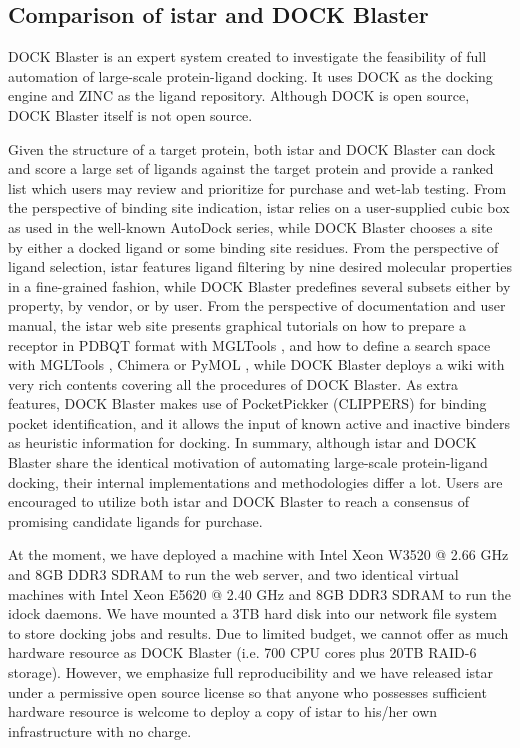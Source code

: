 \documentclass[10pt]{article}
\begin{document}
\subsection*{Comparison of istar and DOCK Blaster}
DOCK Blaster \cite{557} is an expert system created to investigate the feasibility of full automation of large-scale protein-ligand docking. It uses DOCK \cite{1222} as the docking engine and ZINC \cite{532,1178} as the ligand repository. Although DOCK is open source, DOCK Blaster itself is not open source.

Given the structure of a target protein, both istar and DOCK Blaster can dock and score a large set of ligands against the target protein and provide a ranked list which users may review and prioritize for purchase and wet-lab testing. From the perspective of binding site indication, istar relies on a user-supplied cubic box as used in the well-known AutoDock series, while DOCK Blaster chooses a site by either a docked ligand or some binding site residues. From the perspective of ligand selection, istar features ligand filtering by nine desired molecular properties in a fine-grained fashion, while DOCK Blaster predefines several subsets either by property, by vendor, or by user. From the perspective of documentation and user manual, the istar web site presents graphical tutorials on how to prepare a receptor in PDBQT format with MGLTools \cite{596}, and how to define a search space with MGLTools \cite{596}, Chimera \cite{1219} or PyMOL \cite{1221}, while DOCK Blaster deploys a wiki with very rich contents covering all the procedures of DOCK Blaster. As extra features, DOCK Blaster makes use of PocketPickker (CLIPPERS) \cite{395} for binding pocket identification, and it allows the input of known active and inactive binders as heuristic information for docking. In summary, although istar and DOCK Blaster share the identical motivation of automating large-scale protein-ligand docking, their internal implementations and methodologies differ a lot. Users are encouraged to utilize both istar and DOCK Blaster to reach a consensus of promising candidate ligands for purchase.

At the moment, we have deployed a machine with Intel Xeon W3520 @ 2.66 GHz and 8GB DDR3 SDRAM to run the web server, and two identical virtual machines with Intel Xeon E5620 @ 2.40 GHz and 8GB DDR3 SDRAM to run the idock daemons. We have mounted a 3TB hard disk into our network file system to store docking jobs and results. Due to limited budget, we cannot offer as much hardware resource as DOCK Blaster (i.e. 700 CPU cores plus 20TB RAID-6 storage). However, we emphasize full reproducibility and we have released istar under a permissive open source license so that anyone who possesses sufficient hardware resource is welcome to deploy a copy of istar to his/her own infrastructure with no charge.
\end{document}
